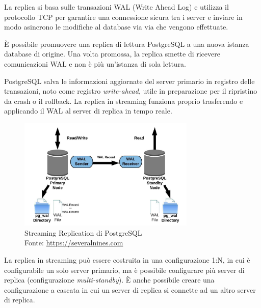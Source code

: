La replica si basa sulle transazioni WAL (Write Ahead Log) e utilizza il protocollo TCP per garantire una connessione sicura tra i server e inviare in modo asincrono le modifiche al database via via che vengono effettuate.

È possibile promuovere una replica di lettura PostgreSQL a una nuova istanza database di origine. Una volta promossa, la replica smette di ricevere comunicazioni WAL e non è più un'istanza di sola lettura.

PostgreSQL salva le informazioni aggiornate del server primario in registro delle transazioni, noto come registro \textit{write-ahead}, utile in preparazione per il ripristino da crash o il rollback. La replica in streaming funziona proprio trasferendo e applicando il WAL al server di replica in tempo reale.

\begin{figure}[H]
\centering
\captionsetup{justification=centering}
\includegraphics[width=0.75\textwidth,height=\textheight,keepaspectratio]{img/streaming_replication.jpg}
\caption{Streaming Replication di PostgreSQL\\Fonte: \url{https://severalnines.com}}
\label{fig:streaming-replication}
\end{figure}

La replica in streaming può essere costruita in una configurazione 1:N, in cui è configurabile un solo server primario, ma è possibile configurare più server di replica (configurazione \textit{multi-standby}). È anche possibile creare una configurazione a cascata in cui un server di replica si connette ad un altro server di replica.

